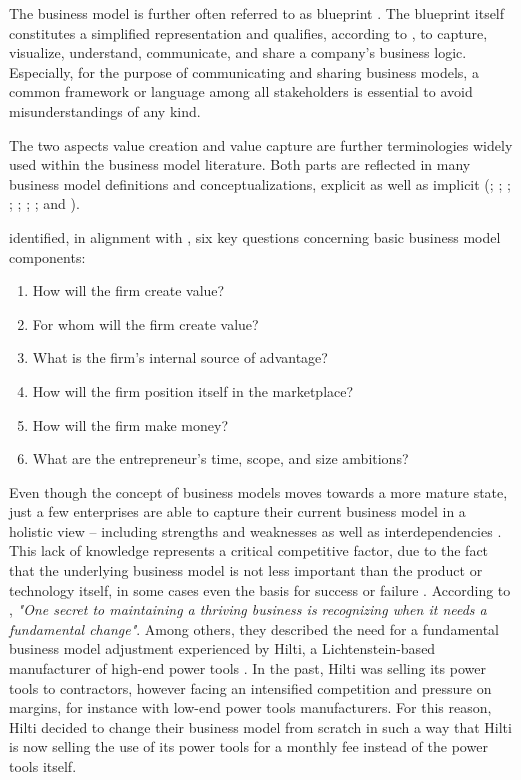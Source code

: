 The business model is further often referred to as blueprint . The blueprint itself constitutes a simplified representation and qualifies, according to \citet[pp. 11-14]{Osterwalder2005}, to capture, visualize, understand, communicate, and share a company's business logic. Especially, for the purpose of communicating and sharing business models, a common framework or language among all stakeholders is essential to avoid misunderstandings of any kind.

The two aspects value creation and value capture are further terminologies widely used within the business model literature. Both parts are reflected in many business model definitions and conceptualizations, explicit as well as implicit (\citealp[p. 511]{Amit2001}; \citealp[pp. 533-534]{Chesbrough2002}; \citealp[p. 727]{Morris2005}; \citealp[p. 202]{Shafer2005}; \citealp[p. 12]{Chesbrough2007}; \citealp[p. 52]{Johnson2008}; \citealp[p. 14]{Osterwalder2010}; and \citealp[pp. 1019-1020]{Zott2011}). 

\citet[pp. 729-732]{Morris2005} identified, in alignment with \citet[pp. 49-61]{Drucker1954}, six key questions concerning basic business model components:

\begin{enumerate}[parsep=0pt, topsep=0pt, itemsep=0pt]
	\item How will the firm create value?
	\item For whom will the firm create value?
	\item What is the firm's internal source of advantage?
	\item How will the firm position itself in the marketplace?
	\item How will the firm make money?
	\item What are the entrepreneur's time, scope, and size ambitions?
\end{enumerate}

Even though the concept of business models moves towards a more mature state, just a few enterprises are able to capture their current business model in a holistic view -- including strengths and weaknesses as well as interdependencies \citep[p. 52]{Johnson2008}. This lack of knowledge represents a critical competitive factor, due to the fact that the underlying business model is not less important than the product or technology itself, in some cases even the basis for success or failure . According to \citet[p. 50]{Johnson2008}, \textit{"One secret to maintaining a thriving business is recognizing when it needs a fundamental change"}. Among others, they described the need for a fundamental business model adjustment experienced by Hilti, a Lichtenstein-based manufacturer of high-end power tools \citep[pp. 54-57]{Johnson2008}. In the past, Hilti was selling its power tools to contractors, however facing an intensified competition and pressure on margins, for instance with low-end power tools manufacturers. For this reason, Hilti decided to change their business model from scratch in such a way that Hilti is now selling the use of its power tools for a monthly fee instead of the power tools itself.

